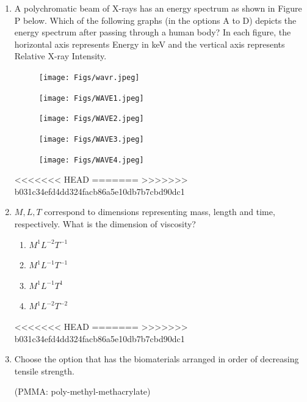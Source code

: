 \documentclass[journal]{IEEEtran}
\begin{document}
\begin{enumerate}
\item  A polychromatic beam of X-rays has an energy spectrum as shown in Figure P below. Which of the following graphs (in the options A to D) depicts the energy spectrum after passing through a human body? In each figure, the horizontal axis represents Energy in keV and the vertical axis represents Relative X-ray Intensity.
\begin{figure}[H]
\centering
\texttt{[image: Figs/wavr.jpeg]}
\caption{}
\end{figure}

\begin{figure}[H]
\centering
\texttt{[image: Figs/WAVE1.jpeg]}
\caption{}
\end{figure}

\begin{figure}[H]
\centering
\texttt{[image: Figs/WAVE2.jpeg]}
\caption{}
\end{figure}

\begin{figure}[H]
\centering
\texttt{[image: Figs/WAVE3.jpeg]}
\caption{}
\end{figure}

\begin{figure}[H]
\centering
\texttt{[image: Figs/WAVE4.jpeg]}
\caption{}
\end{figure}
<<<<<<< HEAD
\hfill{}
=======
\hfill{}
>>>>>>> b031c34efd4dd324facb86a5e10db7b7cbd90dc1

\item  \( M, L, T \) correspond to dimensions representing mass, length and time, respectively. What is the dimension of viscosity?

\begin{enumerate}
    \item \( M^1 L^{-2} T^{-1} \)
    \item \( M^1 L^{-1} T^{-1} \)
    \item \( M^1 L^{-1} T^{1} \)
    \item \( M^1 L^{-2} T^{-2} \)
\end{enumerate}
<<<<<<< HEAD
\hfill{}
=======
\hfill{}
>>>>>>> b031c34efd4dd324facb86a5e10db7b7cbd90dc1

\item  Choose the option that has the biomaterials arranged in order of decreasing tensile strength.

(PMMA: poly-methyl-methacrylate)


\end{enumerate}
\end{document}
